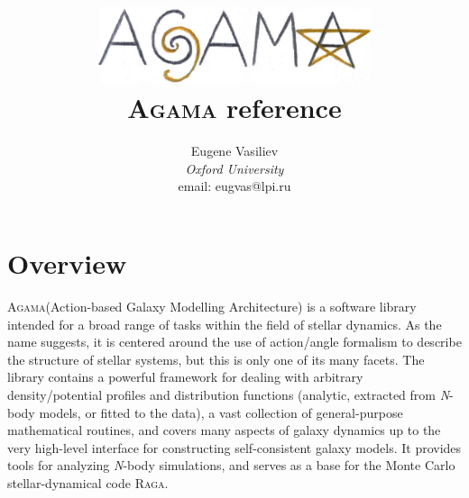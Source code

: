 \documentclass[12pt]{article}
\newcommand{\Agama}{\textsc{Agama}\xspace}
\newcommand{\Raga} {\textsc{Raga}\xspace}
\newcommand{\Nbody}{\textsl{N}-body\xspace}
\begin{document}
\title{\includegraphics[width=8cm]{agama.jpg}\protect\\[0.5cm]\Agama reference}
\author{Eugene Vasiliev\\
\normalsize\textit{Oxford University}\\
\normalsize\textrm{email: eugvas@lpi.ru} }


\maketitle
\tableofcontents
\newpage

\section{Overview}

\Agama (Action-based Galaxy Modelling Architecture) is a software library intended for a broad range of tasks within the field of stellar dynamics. As the name suggests, it is centered around the use of action/angle formalism to describe the structure of stellar systems, but this is only one of its many facets. The library contains a powerful framework for dealing with arbitrary density/potential profiles and distribution functions (analytic, extracted from \Nbody models, or fitted to the data), a vast collection of general-purpose mathematical routines, and covers many aspects of galaxy dynamics up to the very high-level interface for constructing self-consistent galaxy models. It provides tools for analyzing \Nbody simulations, and serves as a base for the Monte Carlo stellar-dynamical code \Raga.
\end{document}
